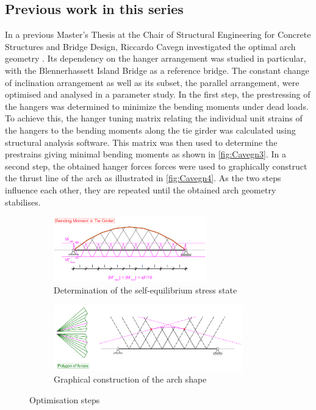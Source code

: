 \subsection{Previous work in this series} \label{sec:rev_prev}
In a previous Master's Thesis at the Chair of Structural Engineering for Concrete Structures and Bridge Design, Riccardo Cavegn investigated the optimal arch geometry \cite{Cavegn}. Its dependency on the hanger arrangement was studied in particular, with the Blennerhassett Island Bridge as a reference bridge. The constant change of inclination arrangement as well as its subset, the parallel arrangement, were optimised and analysed in a parameter study. 
In the first step, the prestressing of the hangers was determined to minimize the bending moments under dead loads. To achieve this, the hanger tuning matrix relating the individual unit strains of the hangers to the bending moments along the tie girder was calculated using structural analysis software. This matrix was then used to determine the prestrains giving minimal bending moments as shown in \autoref{fig:Cavegn3}. In a second step, the obtained hanger forces forces were used to graphically construct the thrust line of the arch as illustrated in \autoref{fig:Cavegn4}. As the two steps influence each other, they are repeated until the obtained arch geometry stabilises.
\begin{figure}[H]
\centering
\begin{subfigure}{0.5\textwidth}
    \centering
    \includegraphics[width=0.73\textwidth]{Pictures/OptimizedBendingMoment.PNG}
    \caption{Determination of the self-equilibrium stress state}
    \label{fig:Cavegn3}
\end{subfigure}%
\begin{subfigure}{.5\textwidth}
    \centering
    \includegraphics[width=0.9\textwidth]{Pictures/GraphicalThrustLineConstruction.PNG}
    \caption{Graphical construction of the arch shape}
    \label{fig:Cavegn4}
\end{subfigure}
\caption{Optimisation steps \cite{Cavegn}}
\label{fig:Cavegn34}
\end{figure}
